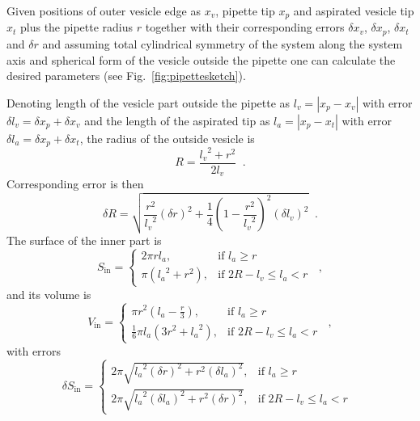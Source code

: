 \documentclass[a4paper,12pt]{article}
\begin{document}
Given positions of outer vesicle edge as $x_v$, pipette tip $x_p$ and aspirated vesicle tip $x_t$ plus the pipette radius $r$ together with their corresponding errors $\delta x_v$, $\delta x_p$, $\delta x_t$ and $\delta r$ and assuming total cylindrical symmetry of the system along the system axis and spherical form of the vesicle outside the pipette one can calculate the desired parameters (see Fig.~\ref{fig:pipettesketch}).

Denoting length of the vesicle part outside the pipette as $l_v = \left|x_p-x_v\right|$ with error $\delta l_v = \delta x_p + \delta x_v$ and the length of the aspirated tip as $l_a = \left|x_p-x_t\right|$ with error $\delta l_a = \delta x_p + \delta x_t$, the radius of the outside vesicle is
\begin{equation*}
R = \frac{{l_v}^2 + r^2}{2l_v}\;\;.
\end{equation*}
Corresponding error is then
\begin{equation*}
 \delta R = \sqrt{\frac{r^2}{{l_v}^2} \left(\delta r\right)^2 + \frac{1}{4}\left(1-\frac{r^2}{{l_v}^2}\right)^2 \left( \delta l_v\right) ^2}\;\;.
\end{equation*}
The surface of the inner part is
\begin{equation*}
S_\text{in} = \left\{
\begin{array}{ll}
	2\pi rl_a,& \text{if } l_a \geq r\\
	\pi\left({l_a}^2+r^2\right),&\text{if } 2R-l_v \leq l_a < r
\end{array}
\right.\;\;,
\end{equation*}
and its volume is
\begin{equation*}
V_{\text{in}} = \left\{
\begin{array}{ll}
	\pi r^2\left(l_a-\frac{r}{3}\right), & \text{if } l_a \geq r\\
	\frac{1}{6}\pi l_a\left(3r^2+{l_a}^2\right),&\text{if } 2R-l_v \leq l_a < r
\end{array}
\right.\;\;,
\end{equation*}
with errors
\begin{equation*}
 \delta S_\text{in} = \left\{
 \begin{array}{ll}
	2\pi \sqrt{{l_a}^2\left(\delta r\right)^2 + r^2\left(\delta l_a\right)^2},& \text{if } l_a \geq r\\
	2\pi \sqrt{{l_a}^2\left(\delta l_a\right)^2 + r^2\left(\delta r\right)^2},&\text{if } 2R-l_v \leq l_a < r
\end{array}
\right.\;\;
\end{equation*}
\end{document}
